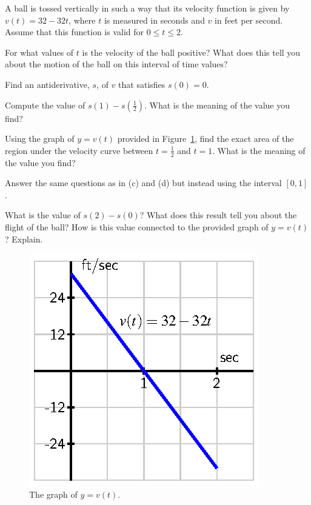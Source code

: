 \begin{activity} \label{A:4.1.2}  A ball is tossed vertically in such a way that its velocity function is given by $v(t) = 32 - 32t$, where $t$ is measured in seconds and $v$ in feet per second.  Assume that this function is valid for $0 \le t \le 2$.
\ba
	\item For what values of $t$ is the velocity of the ball positive?  What does this tell you about the motion of the ball on this interval of time values?
	\item Find an antiderivative, $s$, of $v$ that satisfies $s(0) = 0$.  
	\item Compute the value of $s(1) - s(\frac{1}{2})$.  What is the meaning of the value you find?
	\item Using the graph of $y = v(t)$ provided in Figure~\ref{F:4.1.Act2}, find the exact area of the region under the velocity curve between $t = \frac{1}{2}$ and $t = 1$.  What is the meaning of the value you find?
	\item Answer the same questions as in (c) and (d) but instead using the interval $[0,1]$.
	\item What is the value of $s(2) - s(0)$?  What does this result tell you about the flight of the ball?  How is this value connected to the provided graph of $y = v(t)$?  Explain.
\ea
\begin{figure}[h]
\begin{center}
\includegraphics{figures/4_1_Act2.eps}
\end{center}
\caption{The graph of $y = v(t)$.} \label{F:4.1.Act2}
\end{figure}
\end{activity}

